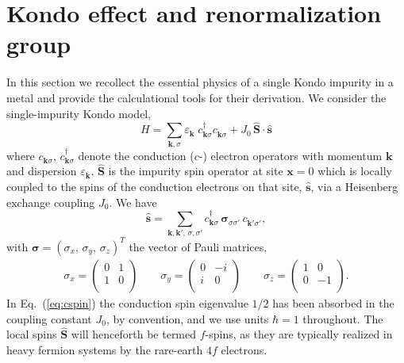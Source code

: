 \documentclass[12pt,twoside]{article}
\newcommand{\phdagger}{{\phantom{\dagger}}}
\newcommand{\bsig}{\boldsymbol\sigma}
\newcommand{\Eq}[1]{Eq.~(\ref{#1})}
\begin{document}

\section{Kondo effect and renormalization group}
\label{sec:Kondo}



In this section we recollect the essential physics of a single Kondo  
impurity in a metal  
and provide the calculational tools for their derivation.  
We consider the single-impurity Kondo model, 
\begin{equation}
H = \sum_{\mathbf{k},\sigma} 
\varepsilon_{\mathbf{k}} \; c_{\mathbf{k} \sigma}^\dagger c_{\mathbf{k} \sigma}^\phdagger +
J_0\, \hat{\mathbf{S}} \cdot \hat{\mathbf{s}} 
\label{eq:KondoHamiltonian}
\end{equation}
where $c_{\mathbf{k} \sigma}^{\phdagger}$, $c_{\mathbf{k}\sigma }^{\dagger}$
denote the conduction 
($c$-) electron operators with momentum $\mathbf{k}$ and 
dispersion $\varepsilon_{\mathbf{k}}$. $\hat{\mathbf{S}}$ is the impurity spin 
operator at site $\mathbf{x}=0$ which is locally coupled to the spins 
of the conduction electrons on that site, $\hat{\mathbf{s}}$, via a Heisenberg 
exchange coupling $J_0$. We have
\begin{equation}
\hat{\mathbf{s}} = \sum_{\mathbf{k},\mathbf{k}',\,\sigma , \sigma '}
c_{\mathbf{k} \sigma}^{\dagger}\, \bsig_{\sigma \sigma '}\, c_{\mathbf{k}' \sigma '}^{\phdagger},
\label{eq:cspin}
\end{equation}
with $\bsig =(\sigma_x,\,\sigma_y,\,\sigma_z)^T$ the vector of Pauli matrices,
\begin{eqnarray}
\sigma_x=\begin{pmatrix}
0 & 1\\
1 & 0\\
\end{pmatrix}
\qquad
\sigma_y=\begin{pmatrix}
0 & -i\\
i & 0\\
\end{pmatrix}
\qquad
\sigma_z=\begin{pmatrix}
1 &  0\\
0 & -1\\
\end{pmatrix}.
\end{eqnarray}
In \Eq{eq:cspin} the conduction spin eigenvalue $1/2$ has been 
absorbed in the coupling constant $J_0$, by convention, 
and we use units $\hbar =1$ throughout. 
The local spins $\hat{\mathbf S}$ will henceforth be termed $f$-spins, 
as they are typically realized in heavy fermion systems by the rare-earth $4f$ 
electrons.
\end{document}
